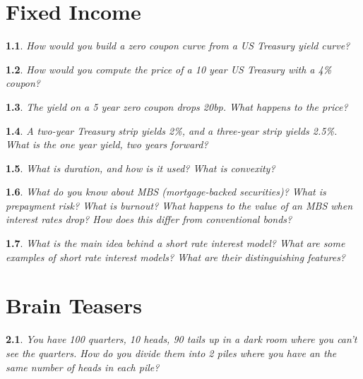 \documentclass{report}
\newtheorem{problem}{}
\numberwithin{problem}{chapter} %
\begin{document}
\chapter{Fixed Income}

\begin{problem}
How would you build a zero coupon curve from a US Treasury yield curve?
\end{problem}

\begin{problem}
How would you compute the price of a 10 year US Treasury with a 4\% coupon?
\end{problem}

\begin{problem}
The yield on a 5 year zero coupon drops 20bp. What happens to the price?
\end{problem}

\begin{problem}
A two-year Treasury strip yields 2\%, and a three-year strip yields 2.5\%. What is the one year yield, two years forward? 
\end{problem}

\begin{problem}
What is duration, and how is it used? What is convexity? 
\end{problem}

\begin{problem}
What do you know about MBS (mortgage-backed securities)? What is prepayment risk? What is burnout? What happens to the value of an MBS when interest rates drop? How does this differ from conventional bonds?
\end{problem}

\begin{problem}
What is the main idea behind a short rate interest model? What are some examples of short rate interest models? What are their distinguishing features?
\end{problem}


\chapter{Brain Teasers}

\begin{problem}
You have 100 quarters, 10 heads, 90 tails up in a dark room where you can't see the quarters. How do you divide them into 2 piles where you have an the same number of heads in each pile?
\end{problem}
\end{document}
